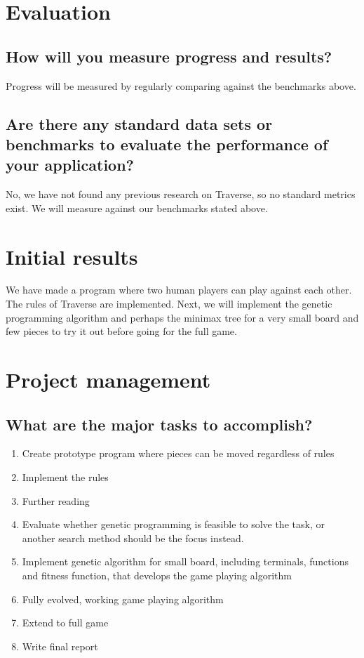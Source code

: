 \documentclass[times, 10pt,twocolumn]{article}
\begin{document}
\section{Evaluation}

\subsection{How will you measure progress and results?}

Progress will be measured by regularly comparing against the benchmarks above.

\subsection{Are there any standard data sets or benchmarks to evaluate the performance of your application?}

No, we have not found any previous research on Traverse, so no standard metrics exist. We will measure against our benchmarks stated above.


\section{Initial results}

We have made a program where two human players can play against each other. The rules of Traverse are implemented. Next, we will implement the genetic programming algorithm and perhaps the minimax tree for a very small board and few pieces to try it out before going for the full game.


\section{Project management}

\subsection{What are the major tasks to accomplish?}

\begin{enumerate}
	\item{Create prototype program where pieces can be moved regardless of rules}
	\item{Implement the rules}
	\item{Further reading}
	\item{Evaluate whether genetic programming is feasible to solve the task, or another search method should be the focus instead.}
	\item{Implement genetic algorithm for small board, including terminals, functions and fitness function, that develops the game playing algorithm}
	\item{Fully evolved, working game playing algorithm}
	\item{Extend to full game}
	\item{Write final report}	
\end{enumerate}
\end{document}
